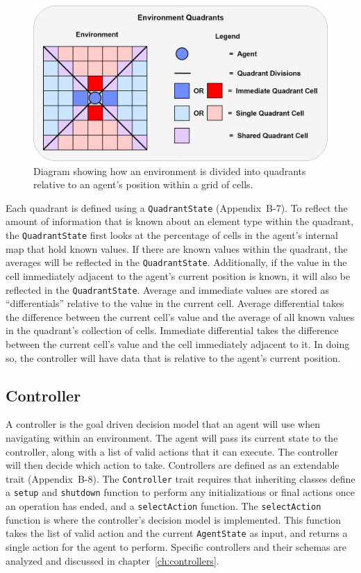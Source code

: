 \begin{figure}[!htb]
  \centering
  \includegraphics[width=1.0\columnwidth]{Figures/quadrants.png}
  \caption[Environment Quadrant Division]{Diagram showing how an environment is divided into quadrants relative to an agent's position within a grid of cells.}
  \label{fig:quadrants}
\end{figure}

Each quadrant is defined using a \texttt{QuadrantState} (Appendix~B-7).
To reflect the amount of information that is known about an element type within the quadrant, the \texttt{QuadrantState} first looks at the percentage of cells in the agent's internal map that hold known values.
If there are known values within the quadrant, the averages will be reflected in the \texttt{QuadrantState}.
Additionally, if the value in the cell immediately adjacent to the agent's current position is known, it will also be reflected in the \texttt{QuadrantState}.
Average and immediate values are stored as ``differentials'' relative to the value in the current cell.
Average differential takes the difference between the current cell's value and the average of all known values in the quadrant's collection of cells.
Immediate differential takes the difference between the current cell's value and the cell immediately adjacent to it.
In doing so, the controller will have data that is relative to the agent's current position.


\subsection{Controller} \label{subsec:controller}
A controller is the goal driven decision model that an agent will use when navigating within an environment.
The agent will pass its current state to the controller, along with a list of valid actions that it can execute.
The controller will then decide which action to take.
Controllers are defined as an extendable trait (Appendix~B-8).
The \texttt{Controller} trait requires that inheriting classes define a \texttt{setup} and \texttt{shutdown} function to perform any initializations or final actions once an operation has ended, and a \texttt{selectAction} function.
The \texttt{selectAction} function is where the controller's decision model is implemented.
This function takes the list of valid action and the current \texttt{AgentState} as input, and returns a single action for the agent to perform.
Specific controllers and their schemas are analyzed and discussed in chapter~\ref{ch:controllers}.




